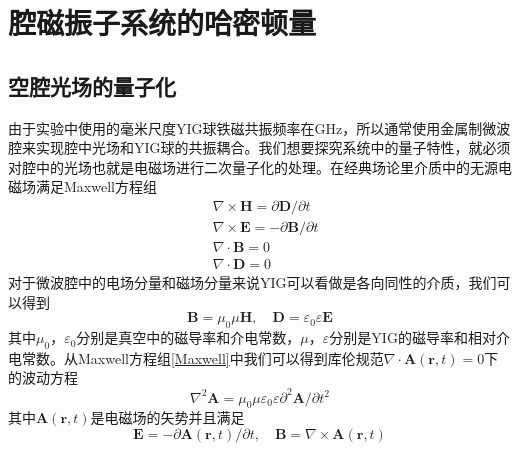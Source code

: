 
\chapter{腔磁振子系统的哈密顿量}
\label{ch2}

\section{空腔光场的量子化}
由于实验中使用的毫米尺度YIG球铁磁共振频率在GHz，所以通常使用金属制微波腔来实现腔中光场和YIG球的共振耦合。我们想要探究系统中的量子特性，就必须对腔中的光场也就是电磁场进行二次量子化的处理。在经典场论里介质中的无源电磁场满足Maxwell方程组
\begin{equation}
\begin{aligned}
& \nabla \times \mathbf{H}=\partial \mathbf{D} / \partial t \\
& \nabla \times \mathbf{E}=-\partial \mathbf{B} / \partial t \\
& \nabla \cdot \mathbf{B}=0 \\
& \nabla \cdot \mathbf{D}=0
\end{aligned}\label{Maxwell}
\end{equation}
对于微波腔中的电场分量和磁场分量来说YIG可以看做是各向同性的介质，我们可以得到
\begin{equation}
\mathbf{B} = \mu_{0} \mu \mathbf{H}, \quad \mathbf{D} = \varepsilon_0 \varepsilon \mathbf{E}
\end{equation}
其中$\mu_{0}$，$\varepsilon_0$分别是真空中的磁导率和介电常数，$\mu$，$\varepsilon$分别是YIG的磁导率和相对介电常数。从Maxwell方程组\eqref{Maxwell}中我们可以得到库伦规范$\nabla\cdot\mathbf{A}(\mathbf{r}, t)=0$下的波动方程
\begin{equation}
\nabla^{2} \mathbf{A}=\mu_{0}\mu \varepsilon_0\varepsilon \partial^{2} \mathbf{A} / \partial t^{2} \label{WaveFunction}
\end{equation}
其中$\mathbf{A}(\mathbf{r}, t)$是电磁场的矢势并且满足
\begin{equation}
\mathbf{E}=-\partial \mathbf{A}(\mathbf{r}, t) / \partial t, \quad \mathbf{B}=\nabla \times \mathbf{A}(\mathbf{r}, t)
\label{EBARelations}
\end{equation}


